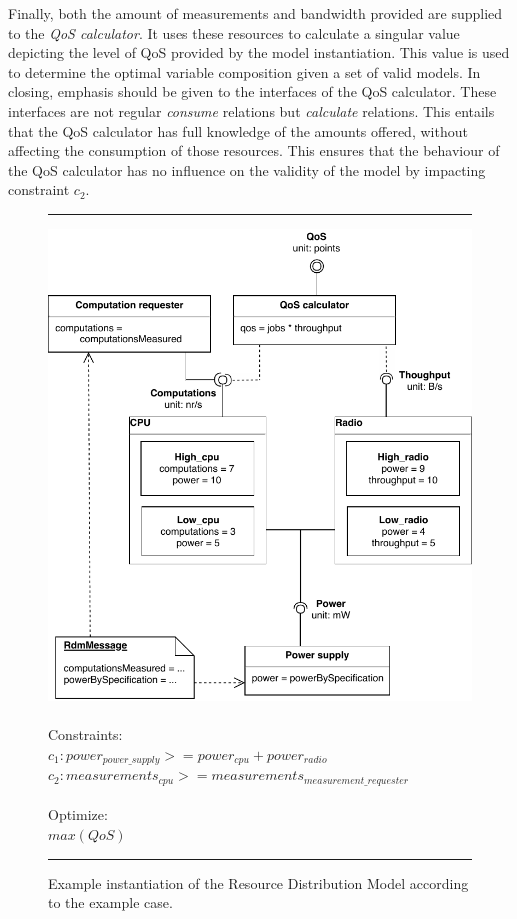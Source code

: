 Finally, both the amount of measurements and bandwidth provided are supplied to the \emph{QoS calculator}. It uses these resources to calculate a singular value depicting the level of QoS provided by the model instantiation. This value is used to determine the optimal variable composition given a set of valid models. In closing, emphasis should be given to the interfaces of the QoS calculator. These interfaces are not regular \emph{consume} relations but \emph{calculate} relations. This entails that the QoS calculator has full knowledge of the amounts offered, without affecting the consumption of those resources. This ensures that the behaviour of the QoS calculator has no influence on the validity of the model by impacting constraint $c_2$.

\begin{figure}
\hrule
\begingroup\centering
  \includegraphics[width=\linewidth]{resources/img/rdm_cpu_radio.pdf}\endgroup \\ \\
  \noindent Constraints: \\
$c_1: power_{power\_supply} >= power_{cpu}+power_{radio} $ \\ 
$c_2: measurements_{cpu} >= measurements_{measurement\_requester}$ \\ \\
\noindent Optimize:\\$max(QoS)$\\
\hrule
\caption{Example instantiation of the Resource Distribution Model according to the example case.}
  \label{fig:rdm_cpu_radio}
\end{figure}

